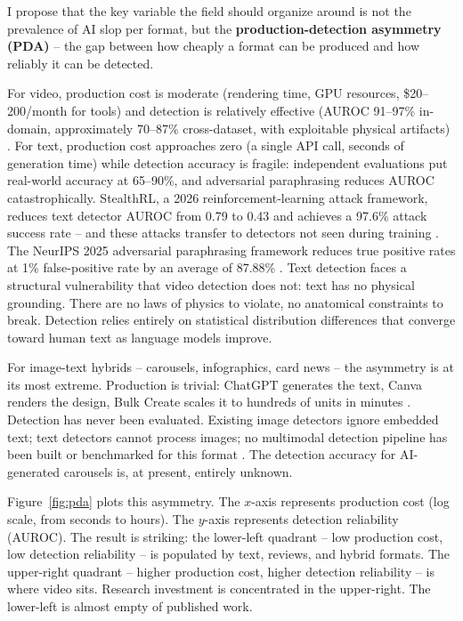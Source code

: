 \documentclass[12pt]{article}
\begin{document}
I propose that the key variable the field should organize around is not the prevalence of AI slop per format, but the \textbf{production-detection asymmetry (PDA)} -- the gap between how cheaply a format can be produced and how reliably it can be detected.

For video, production cost is moderate (rendering time, GPU resources, \$20--200/month for tools) and detection is relatively effective (AUROC 91--97\% in-domain, approximately 70--87\% cross-dataset, with exploitable physical artifacts) \cite{deepfake2020}. For text, production cost approaches zero (a single API call, seconds of generation time) while detection accuracy is fragile: independent evaluations put real-world accuracy at 65--90\%, and adversarial paraphrasing reduces AUROC catastrophically. StealthRL, a 2026 reinforcement-learning attack framework, reduces text detector AUROC from 0.79 to 0.43 and achieves a 97.6\% attack success rate -- and these attacks transfer to detectors not seen during training \cite{stealthrl2026}. The NeurIPS 2025 adversarial paraphrasing framework reduces true positive rates at 1\% false-positive rate by an average of 87.88\% \cite{neurips2025adversarial}. Text detection faces a structural vulnerability that video detection does not: text has no physical grounding. There are no laws of physics to violate, no anatomical constraints to break. Detection relies entirely on statistical distribution differences that converge toward human text as language models improve.

For image-text hybrids -- carousels, infographics, card news -- the asymmetry is at its most extreme. Production is trivial: ChatGPT generates the text, Canva renders the design, Bulk Create scales it to hundreds of units in minutes \cite{jackreview2026}. Detection has never been evaluated. Existing image detectors ignore embedded text; text detectors cannot process images; no multimodal detection pipeline has been built or benchmarked for this format \cite{nostudy2026}. The detection accuracy for AI-generated carousels is, at present, entirely unknown.

Figure~\ref{fig:pda} plots this asymmetry. The $x$-axis represents production cost (log scale, from seconds to hours). The $y$-axis represents detection reliability (AUROC). The result is striking: the lower-left quadrant -- low production cost, low detection reliability -- is populated by text, reviews, and hybrid formats. The upper-right quadrant -- higher production cost, higher detection reliability -- is where video sits. Research investment is concentrated in the upper-right. The lower-left is almost empty of published work.
\end{document}

